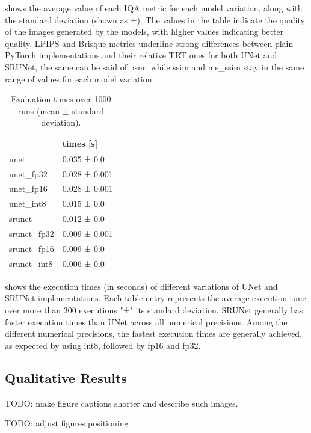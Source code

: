  shows the average value of each IQA metric for each model variation, along with the standard deviation (shown as ±). The values in the table indicate the quality of the images generated by the models, with higher values indicating better quality.
LPIPS and Brisque metrics underline strong differences between plain PyTorch implementations and their relative TRT ones for both UNet and SRUNet, the same can be said of psnr, while ssim and ms\_ssim stay in the same range of values for each model variation.

\begin{table}[t]
\begin{tabular}{ll}
\toprule
{} &      times [s] \\
\midrule
unet        &    0.035 ± 0.0 \\
unet\_fp32   &  0.028 ± 0.001 \\
unet\_fp16   &  0.028 ± 0.001 \\
unet\_int8   &    0.015 ± 0.0 \\
srunet      &    0.012 ± 0.0 \\
srunet\_fp32 &  0.009 ± 0.001 \\
srunet\_fp16 &    0.009 ± 0.0 \\
srunet\_int8 &    0.006 ± 0.0 \\
\bottomrule
\end{tabular}
\caption{Evaluation times over 1000 runs (mean $\pm$ standard deviation).}
\label{tab:tab2}
\end{table}

 shows the execution times (in seconds) of different variations of UNet and SRUNet implementations. Each table entry represents the average execution time over more than 300 executions "±" its standard deviation. SRUNet generally has faster execution times than UNet across all numerical precisions. Among the different numerical precisions, the fastest execution times are generally achieved, as expected by using int8, followed by fp16 and fp32.

\subsection{Qualitative Results}

TODO: make figure captions shorter and describe such images.

TODO: adjust figures positioning

